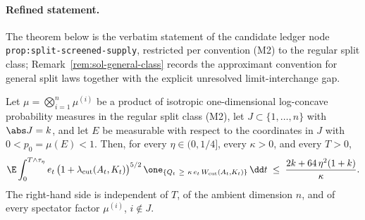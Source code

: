 \documentclass[../main.tex]{subfiles}
\begin{document}
\paragraph{Refined statement.}
The theorem below is the verbatim statement of the candidate ledger node
\texttt{prop:split-screened-supply}, restricted per convention (M2) to the regular split
class; Remark~\ref{rem:sol-general-class} records the approximant convention for general split
laws together with the explicit unresolved limit-interchange gap.

\begin{theorem}
\label{thm:sol-split-screened-supply}
Let $\mu=\bigotimes_{i=1}^n\mu^{(i)}$ be a product of isotropic one-dimensional log-concave
probability measures in the regular split class (M2), let $J\subset\{1,\dots,n\}$ with
$\abs J=k$, and let $E$ be measurable with respect to the coordinates in $J$ with
$0<p_0=\mu(E)<1$.  Then, for every $\eta\in(0,1/4]$, every $\kappa>0$, and every $T>0$,
\begin{equation}
\label{eq:sol-split-screened-supply}
  \E\int_0^{T\wedge\tau_\eta}
    e_t\,\bigl(1+\lambda_{\rm cut}(A_t,K_t)\bigr)^{5/2}\,
    \one_{\{Q_t\ \ge\ \kappa\,e_t\,W_{\rm cut}(A_t,K_t)\}}\,\dd t
  \;\le\;\frac{2k+64\,\eta^2(1+k)}{\kappa}.
\end{equation}
The right-hand side is independent of $T$, of the ambient dimension $n$, and of every
spectator factor $\mu^{(i)}$, $i\notin J$.
\end{theorem}
\end{document}
